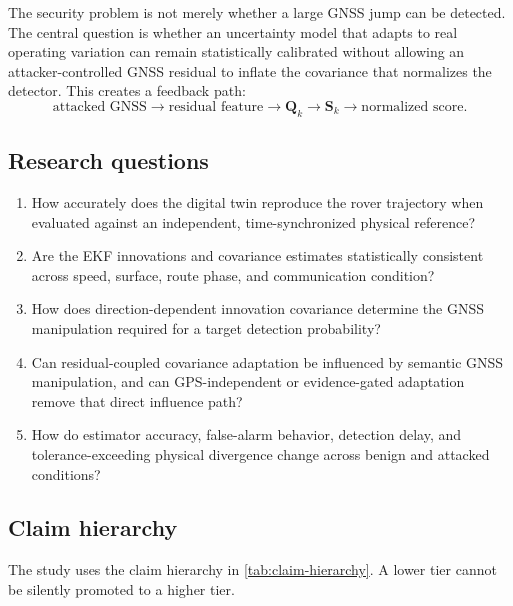 \documentclass[11pt,a4paper]{article}
\begin{document}
The security problem is not merely whether a large GNSS jump can be detected.
The central question is whether an uncertainty model that adapts to real
operating variation can remain statistically calibrated without allowing an
attacker-controlled GNSS residual to inflate the covariance that normalizes
the detector. This creates a feedback path:
\[
\text{attacked GNSS}\rightarrow\text{residual feature}
\rightarrow\mathbf Q_k\rightarrow\mathbf S_k
\rightarrow\text{normalized score}.
\]

\subsection{Research questions}

\begin{enumerate}
  \item How accurately does the digital twin reproduce the rover trajectory
  when evaluated against an independent, time-synchronized physical reference?
  \item Are the EKF innovations and covariance estimates statistically
  consistent across speed, surface, route phase, and communication condition?
  \item How does direction-dependent innovation covariance determine the GNSS
  manipulation required for a target detection probability?
  \item Can residual-coupled covariance adaptation be influenced by semantic
  GNSS manipulation, and can GPS-independent or evidence-gated adaptation
  remove that direct influence path?
  \item How do estimator accuracy, false-alarm behavior, detection delay, and
  tolerance-exceeding physical divergence change across benign and attacked
  conditions?
\end{enumerate}

\subsection{Claim hierarchy}

The study uses the claim hierarchy in \cref{tab:claim-hierarchy}. A lower tier
cannot be silently promoted to a higher tier.
\end{document}
